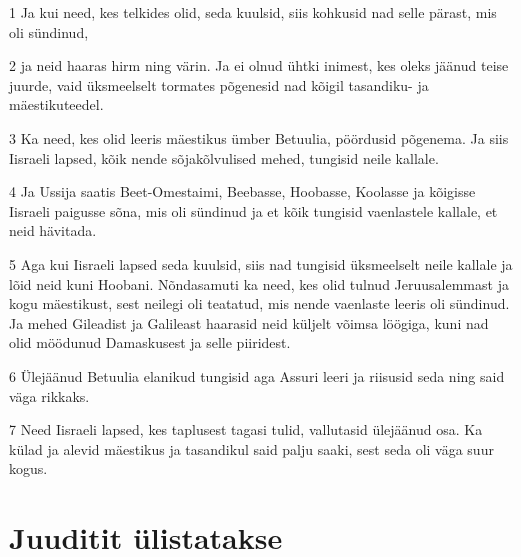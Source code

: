\par 1 Ja kui need, kes telkides olid, seda kuulsid, siis kohkusid nad selle pärast, mis oli sündinud,
\par 2 ja neid haaras hirm ning värin. Ja ei olnud ühtki inimest, kes oleks jäänud teise juurde, vaid üksmeelselt tormates põgenesid nad kõigil tasandiku- ja mäestikuteedel.
\par 3 Ka need, kes olid leeris mäestikus ümber Betuulia, pöördusid põgenema. Ja siis Iisraeli lapsed, kõik nende sõjakõlvulised mehed, tungisid neile kallale.
\par 4 Ja Ussija saatis Beet-Omestaimi, Beebasse, Hoobasse, Koolasse ja kõigisse Iisraeli paigusse sõna, mis oli sündinud ja et kõik tungisid vaenlastele kallale, et neid hävitada.
\par 5 Aga kui Iisraeli lapsed seda kuulsid, siis nad tungisid üksmeelselt neile kallale ja lõid neid kuni Hoobani. Nõndasamuti ka need, kes olid tulnud Jeruusalemmast ja kogu mäestikust, sest neilegi oli teatatud, mis nende vaenlaste leeris oli sündinud. Ja mehed Gileadist ja Galileast haarasid neid küljelt võimsa löögiga, kuni nad olid möödunud Damaskusest ja selle piiridest.
\par 6 Ülejäänud Betuulia elanikud tungisid aga Assuri leeri ja riisusid seda ning said väga rikkaks.
\par 7 Need Iisraeli lapsed, kes taplusest tagasi tulid, vallutasid ülejäänud osa. Ka külad ja alevid mäestikus ja tasandikul said palju saaki, sest seda oli väga suur kogus.

\section*{Juuditit ülistatakse}

